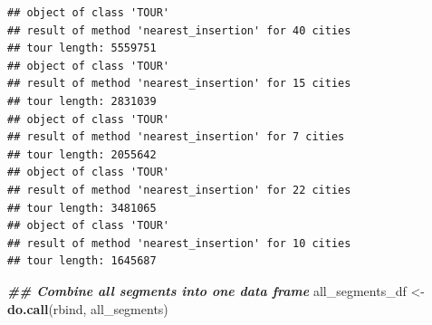 \documentclass[
]{article}
\newenvironment{Shaded}{\begin{snugshade}}{\end{snugshade}}
\newcommand{\DocumentationTok}[1]{\textcolor[rgb]{0.56,0.35,0.01}{\textbf{\textit{#1}}}}
\newcommand{\FunctionTok}[1]{\textcolor[rgb]{0.13,0.29,0.53}{\textbf{#1}}}
\newcommand{\NormalTok}[1]{#1}
\newcommand{\OtherTok}[1]{\textcolor[rgb]{0.56,0.35,0.01}{#1}}
\begin{document}
\begin{verbatim}
## object of class 'TOUR' 
## result of method 'nearest_insertion' for 40 cities
## tour length: 5559751 
## object of class 'TOUR' 
## result of method 'nearest_insertion' for 15 cities
## tour length: 2831039 
## object of class 'TOUR' 
## result of method 'nearest_insertion' for 7 cities
## tour length: 2055642 
## object of class 'TOUR' 
## result of method 'nearest_insertion' for 22 cities
## tour length: 3481065 
## object of class 'TOUR' 
## result of method 'nearest_insertion' for 10 cities
## tour length: 1645687
\end{verbatim}

\begin{Shaded}
\begin{Highlighting}[]
\DocumentationTok{\#\# Combine all segments into one data frame}
\NormalTok{all\_segments\_df }\OtherTok{\textless{}{-}} \FunctionTok{do.call}\NormalTok{(rbind, all\_segments)}
\end{Highlighting}
\end{Shaded}
\end{document}
